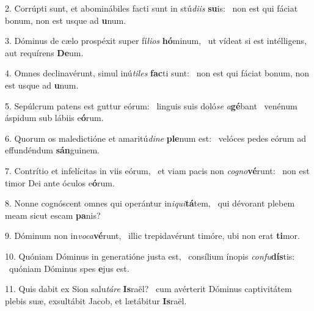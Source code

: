 2. Corrúpti sunt, et abominábiles facti sunt in stú\textit{di}\textit{is} \textbf{su}is: \ast\  non est qui fáciat bonum, non est usque ad \textbf{u}num.\

3. Dóminus de cælo prospéxit super fí\textit{li}\textit{os} \textbf{hó}minum, \ast\  ut vídeat si est intélligens, aut requírens \textbf{De}um.\

4. Omnes declinavérunt, simul inú\textit{ti}\textit{les} \textbf{fac}ti sunt: \ast\  non est qui fáciat bonum, non est usque ad \textbf{u}num.\

5. Sepúlcrum patens est guttur eórum: \dag\  linguis suis doló\textit{se} \textit{a}\textbf{gé}bant \ast\  venénum áspidum sub lábiis e\textbf{ó}rum.\

6. Quorum os maledictióne et amaritú\textit{di}\textit{ne} \textbf{ple}num est: \ast\  velóces pedes eórum ad effundéndum \textbf{sán}guinem.\

7. Contrítio et infelícitas in viis eórum, \dag\  et viam pacis non \textit{co}\textit{gno}\textbf{vé}runt: \ast\  non est timor Dei ante óculos e\textbf{ó}rum.\

8. Nonne cognóscent omnes qui operántur in\textit{i}\textit{qui}\textbf{tá}tem, \ast\  qui dévorant plebem meam sicut escam \textbf{pa}nis?\

9. Dóminum non in\textit{vo}\textit{ca}\textbf{vé}runt, \ast\  illic trepidavérunt timóre, ubi non erat \textbf{ti}mor.\

10. Quóniam Dóminus in generatióne justa est, \dag\  consílium ínopis \textit{con}\textit{fu}\textbf{dís}tis: \ast\  quóniam Dóminus spes \textbf{e}jus est.\

11. Quis dabit ex Sion salu\textit{tá}\textit{re} \textbf{Is}raël? \ast\  cum avérterit Dóminus captivitátem plebis suæ, exsultábit Jacob, et lætábitur \textbf{Is}raël.\

